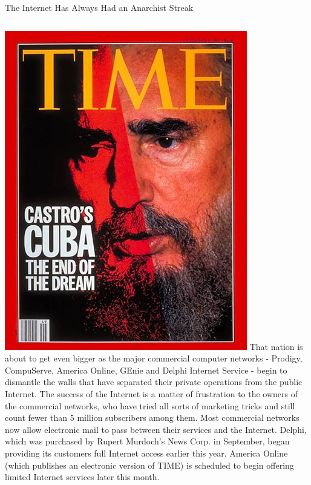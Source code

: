 \documentclass[nobackground,dvipsnames,table,aspectratio=169]{beamer}
\begin{document}
\begin{frame}{The Internet Has Always Had an Anarchist Streak}
    \begin{columns}[c]
            \includegraphics[width=\textwidth]{time-castro}
            \scriptsize
            That nation is about to get even bigger as the major commercial computer networks - Prodigy, CompuServe, America Online, GEnie and Delphi Internet Service - begin to dismantle the walls that have separated their private operations from the public Internet. The success of the Internet is a matter of frustration to the owners of the commercial networks, who have tried all sorts of marketing tricks and still count fewer than 5 million subscribers among them. Most commercial networks now allow electronic mail to pass between their services and the Internet. Delphi, which was purchased by Rupert Murdoch's News Corp. in September, began providing its customers full Internet access earlier this year. America Online (which publishes an electronic version of TIME) is scheduled to begin offering limited Internet services later this month.\\~\\
            

\end{columns}
\end{frame}
\end{document}
